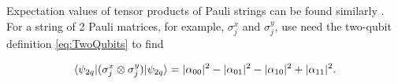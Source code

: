 Expectation values of tensor products of Pauli strings can be found similarly \cite{LaRose2021}. For a string of 2 Pauli matrices, for example, $\sigma_j^x$ and $\sigma_j^y$, use need the two-qubit definition \cref{eq:TwoQubits} to find

\begin{equation}\label{eq:ExpectTensor}
	\langle\psi_{2q}\rvert( \sigma_j^x \otimes \sigma_j^ y) \lvert\psi_{2q}\rangle 
	= |\alpha_{00}|^2 - |\alpha_{01}|^2 - |\alpha_{10}|^2 + |\alpha_{11}|^2.
\end{equation}







